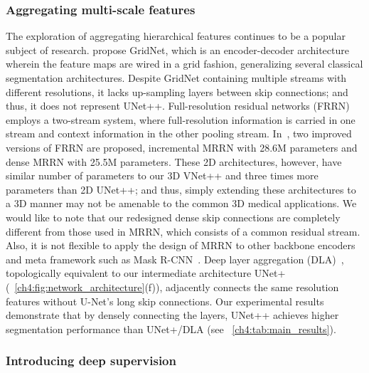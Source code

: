 \subsubsection{Aggregating multi-scale features}
\label{ch1:related_work:designing_advanced_architectures:feature_aggregation}
The exploration of aggregating hierarchical features continues to be a popular subject of research. \citet{fourure2017gridnet} propose GridNet, which is an encoder-decoder architecture wherein the feature maps are wired in a grid fashion, generalizing several classical segmentation architectures. Despite GridNet containing multiple streams with different resolutions, it lacks up-sampling layers between skip connections; and thus, it does not represent UNet++.
Full-resolution residual networks (FRRN)~\citep{pohlen2017full} employs a two-stream system, where full-resolution information is carried in one stream and context information in the other pooling stream. In~\citet{jiang2019multiple}, two improved versions of FRRN are proposed, \ie incremental MRRN with 28.6M parameters and dense MRRN with 25.5M parameters. 
These 2D architectures, however, have similar number of parameters to our 3D VNet++ and three times more parameters than 2D UNet++; and thus, simply extending these architectures to a 3D manner may not be amenable to the common 3D medical applications.
We would like to note that our redesigned dense skip connections are completely different from those used in MRRN, which consists of a common residual stream. Also, it is not flexible to apply the design of MRRN to other backbone encoders and meta framework such as Mask R-CNN~\citep{he2017mask}. Deep layer aggregation (DLA)~\citep{yu2018deep}, topologically equivalent to our intermediate architecture UNet+ (\figurename~\ref{ch4:fig:network_architecture}(f)), adjacently connects the same resolution features without U-Net's long skip connections. Our experimental results demonstrate that by densely connecting the layers, UNet++ achieves higher segmentation performance than UNet+/DLA (see \tableautorefname~\ref{ch4:tab:main_results}). 

\subsubsection{Introducing deep supervision}
\label{ch1:related_work:designing_advanced_architectures:deep_supervision}

